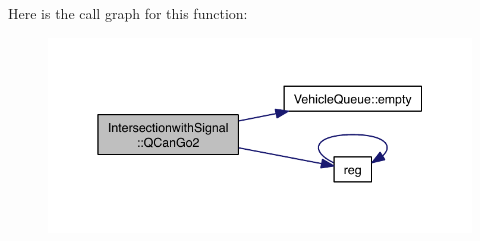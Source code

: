 Here is the call graph for this function\-:\nopagebreak
\begin{figure}[H]
\begin{center}
\leavevmode
\includegraphics[width=342pt]{class_intersectionwith_signal_ab0fcf7dc880fef1175ce0a71c969875f_cgraph}
\end{center}
\end{figure}




